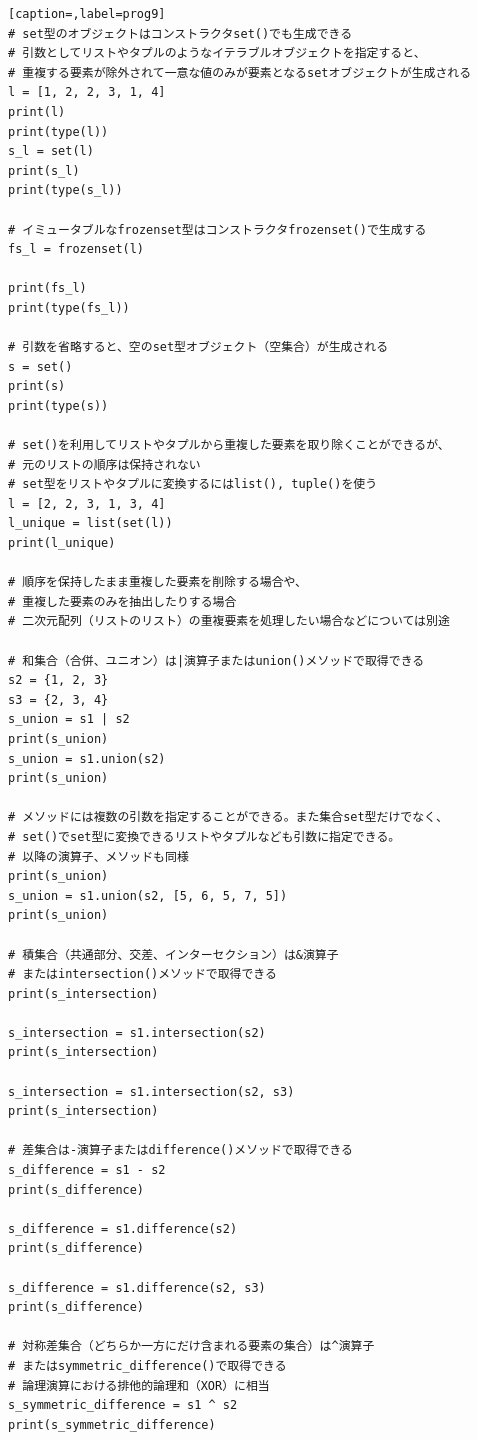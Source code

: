 \documentclass[uplatex,a4paper,11pt,oneside,openany]{jsbook}
\begin{document}
\begin{lstlisting}[caption=,label=prog9]
# set型のオブジェクトはコンストラクタset()でも生成できる
# 引数としてリストやタプルのようなイテラブルオブジェクトを指定すると、
# 重複する要素が除外されて一意な値のみが要素となるsetオブジェクトが生成される
l = [1, 2, 2, 3, 1, 4]
print(l)
print(type(l))
s_l = set(l)
print(s_l)
print(type(s_l))

# イミュータブルなfrozenset型はコンストラクタfrozenset()で生成する
fs_l = frozenset(l)

print(fs_l)
print(type(fs_l))

# 引数を省略すると、空のset型オブジェクト（空集合）が生成される
s = set()
print(s)
print(type(s))

# set()を利用してリストやタプルから重複した要素を取り除くことができるが、
# 元のリストの順序は保持されない
# set型をリストやタプルに変換するにはlist(), tuple()を使う
l = [2, 2, 3, 1, 3, 4]
l_unique = list(set(l))
print(l_unique)

# 順序を保持したまま重複した要素を削除する場合や、
# 重複した要素のみを抽出したりする場合
# 二次元配列（リストのリスト）の重複要素を処理したい場合などについては別途

# 和集合（合併、ユニオン）は|演算子またはunion()メソッドで取得できる
s2 = {1, 2, 3}
s3 = {2, 3, 4}
s_union = s1 | s2
print(s_union)
s_union = s1.union(s2)
print(s_union)

# メソッドには複数の引数を指定することができる。また集合set型だけでなく、
# set()でset型に変換できるリストやタプルなども引数に指定できる。
# 以降の演算子、メソッドも同様
print(s_union)
s_union = s1.union(s2, [5, 6, 5, 7, 5])
print(s_union)

# 積集合（共通部分、交差、インターセクション）は&演算子
# またはintersection()メソッドで取得できる
print(s_intersection)

s_intersection = s1.intersection(s2)
print(s_intersection)

s_intersection = s1.intersection(s2, s3)
print(s_intersection)

# 差集合は-演算子またはdifference()メソッドで取得できる
s_difference = s1 - s2
print(s_difference)

s_difference = s1.difference(s2)
print(s_difference)

s_difference = s1.difference(s2, s3)
print(s_difference)

# 対称差集合（どちらか一方にだけ含まれる要素の集合）は^演算子
# またはsymmetric_difference()で取得できる
# 論理演算における排他的論理和（XOR）に相当
s_symmetric_difference = s1 ^ s2
print(s_symmetric_difference)


\end{lstlisting}
\end{document}
